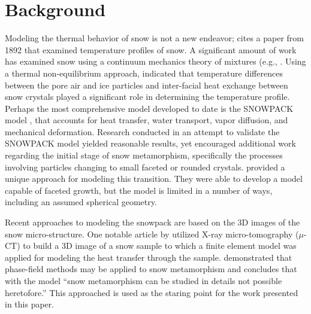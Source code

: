 \section{Background}\label{sec:background}
Modeling the thermal behavior of snow is not a new endeavor; \citet{lachapelle1960critique} cites a paper from 1892 that examined temperature profiles of snow. A significant amount of work has examined snow using a continuum mechanics theory of mixtures (e.g., \citet{adams1989constitutive, brown1999mixture}.  Using a thermal non-equilibrium approach, \citet{bartelt2004nonequilibrium} indicated that temperature differences between the pore air and ice particles and inter-facial heat exchange between snow crystals played a significant role in determining the temperature profile. Perhaps the most comprehensive model developed to date is the SNOWPACK model \citep{bartelt2002physical, lehning2002physical, lehning2002physicalb}, that accounts for heat transfer, water transport, vapor diffusion, and mechanical deformation.  Research conducted in an attempt to validate the SNOWPACK model yielded reasonable results, yet \citet{fierz2001assessment} encouraged additional work regarding the initial stage of snow metamorphism, specifically the processes involving particles changing to small faceted or rounded crystals. \citet{miller2009microstructural} provided a unique approach for modeling this transition. They were able to develop a model capable of faceted growth, but the model is limited in a number of ways, including an assumed spherical geometry.

Recent approaches to modeling the snowpack are based on the 3D images of the snow micro-structure.  One notable article by \citet{kaempfer2005microstructural} utilized X-ray micro-tomography ($\mu$-CT) to build a 3D image of a snow sample to which a finite element model was applied for modeling the heat transfer through the sample. \citet{kaempfer2009phase} demonstrated that phase-field methods may be applied to snow metamorphism and concludes that with the model ``snow metamorphism can be studied in details not possible heretofore.'' This approached is used as the staring point for the work presented in this paper.



